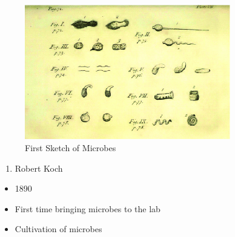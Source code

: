 \documentclass[
]{book}
\providecommand{\tightlist}{%
  \setlength{\itemsep}{0pt}\setlength{\parskip}{0pt}}
\begin{document}
\begin{figure}
\centering
\includegraphics[width=0.8\textwidth,height=\textheight]{./Figures/leeuwenhoeck.png}
\caption{First Sketch of Microbes}
\end{figure}

\begin{enumerate}
\def\labelenumi{\arabic{enumi}.}
\setcounter{enumi}{1}
\tightlist
\item
  Robert Koch
\end{enumerate}

\begin{itemize}
\tightlist
\item
  1890
\item
  First time bringing microbes to the lab
\item
  Cultivation of microbes
\end{itemize}
\end{document}
